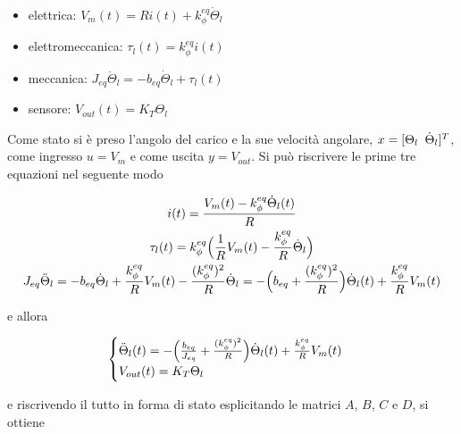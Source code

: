 	\begin{itemize}
		\item elettrica: $V_m(t)=Ri(t)+k_{\phi}^{eq}\dot{\Theta}_l$
		\item elettromeccanica: $\tau_l(t)=k_{\phi}^{eq}i(t)$
		\item meccanica: $J_{eq}\ddot{\Theta}_l=-b_{eq}\dot{\Theta}_l+\tau_l(t)$
		\item sensore: $V_{out}(t)=K_T\Theta_l$
	\end{itemize}  
		
	\noindent Come stato si è preso l'angolo del carico e la sue velocità angolare, $x=[\Theta_l \singleSpacing \dot{\Theta}_l]^T$, come ingresso $u=V_m$ e come uscita $y=V_{out}$. Si può riscrivere le prime tre equazioni nel seguente modo
		
	\begin{gather}
		i(t)=\frac{V_m(t)-k_{\phi}^{eq}\dot{\Theta}_l(t)}{R} \\
		\tau_l(t)=k_{\phi}^{eq}\Bigl(\frac{1}{R}V_m(t)-\frac{k_{\phi}^{eq}}{R}\dot{\Theta}_l\Bigl) \\
		J_{eq}\ddot{\Theta}_l=-b_{eq}\dot{\Theta}_l+\frac{k_{\phi}^{eq}}{R}V_m(t)-\frac{(k_{\phi}^{eq})^2}{R}\dot{\Theta}_l=-\Bigl(b_{eq}+\frac{(k_{\phi}^{eq})^2}{R}\Bigl)\dot{\Theta}_l(t)+\frac{k_{\phi}^{eq}}{R}V_m(t)
	\end{gather}  
		
	\noindent e allora
		
	\begin{equation}
		\begin{cases}
			\ddot{\Theta}_l(t)=-\Bigl(\frac{b_{eq}}{J_{eq}}+\frac{(k_{\phi}^{eq})^2}{R}\Bigl)\dot{\Theta}_l(t)+\frac{k_{\phi}^{eq}}{R}V_m(t) \\
			V_{out}(t)=K_T\Theta_l
		\end{cases}
	\end{equation}
		
	\noindent e riscrivendo il tutto in forma di stato esplicitando le matrici $A$, $B$, $C$ e $D$, si ottiene
		
